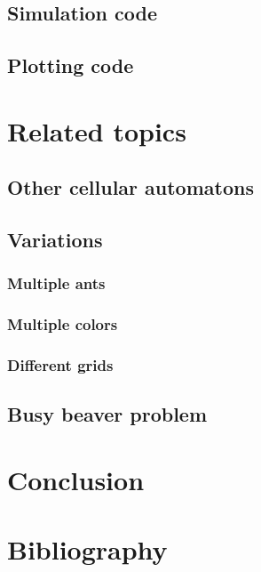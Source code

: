 \documentclass{article}
\begin{document}
\subsection{Simulation code}
\subsection{Plotting code}

\section{Related topics}
\subsection{Other cellular automatons}
\subsection{Variations}
\subsubsection{Multiple ants}
\subsubsection{Multiple colors}
\subsubsection{Different grids}
\subsection{Busy beaver problem}


\section{Conclusion}


\section{Bibliography}
\end{document}
